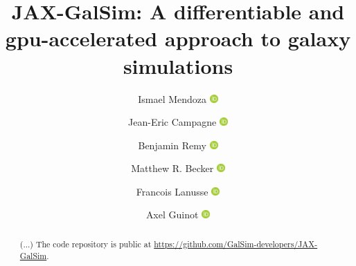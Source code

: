 \documentclass[twocolumn,twocolappendix]{openjournal}
\begin{document}
\title{JAX-GalSim: A differentiable and gpu-accelerated approach to galaxy simulations}

\author{Ismael Mendoza \hskip2pt\href{https://orcid.org/0000-0002-6313-4597}{\includegraphics[width=9pt]{Orcid-ID.png}}}

\author{Jean-Eric Campagne \hskip2pt\href{https://orcid.org/0000-0002-1590-6927}{\includegraphics[width=9pt]{Orcid-ID.png}}}

\author{Benjamin Remy \hskip2pt\href{https://orcid.org/XXXX-XXXX-XXXX-XXXX}{\includegraphics[width=9pt]{Orcid-ID.png}}}

\author{Matthew R. Becker \hskip2pt\href{https://orcid.org/0000-0001-7774-2246}{\includegraphics[width=9pt]{Orcid-ID.png}}}

\author{Francois Lanusse \hskip2pt\href{https://orcid.org/XXXX-XXXX-XXXX-XXXX}{\includegraphics[width=9pt]{Orcid-ID.png}}}

\author{Axel Guinot \hskip2pt\href{https://orcid.org/0000-0002-5068-7918}{\includegraphics[width=9pt]{Orcid-ID.png}}}

\begin{abstract}
(...)
The \jgalsim code repository is public at \url{https://github.com/GalSim-developers/JAX-GalSim}.  
\end{abstract}

\end{document}
